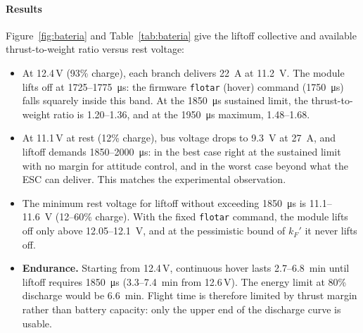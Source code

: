 \paragraph{Results}
Figure~\ref{fig:bateria} and Table~\ref{tab:bateria} give the liftoff collective and available thrust-to-weight ratio versus rest voltage:
\begin{itemize}
  \item At 12.4\,V (93\% charge), each branch delivers \SI{22}{\ampere} at \SI{11.2}{\volt}. The module lifts off at 1725--\SI{1775}{\micro\second}: the firmware \texttt{flotar} (hover) command (\SI{1750}{\micro\second}) falls squarely inside this band. At the \SI{1850}{\micro\second} sustained limit, the thrust-to-weight ratio is 1.20--1.36, and at the \SI{1950}{\micro\second} maximum, 1.48--1.68.
  \item At 11.1\,V at rest (12\% charge), bus voltage drops to \SI{9.3}{\volt} at \SI{27}{\ampere}, and liftoff demands 1850--\SI{2000}{\micro\second}: in the best case right at the sustained limit with no margin for attitude control, and in the worst case beyond what the ESC can deliver. This matches the experimental observation.
  \item The minimum rest voltage for liftoff without exceeding \SI{1850}{\micro\second} is 11.1--\SI{11.6}{\volt} (12--60\% charge). With the fixed \texttt{flotar} command, the module lifts off only above 12.05--\SI{12.1}{\volt}, and at the pessimistic bound of $k_F'$ it never lifts off.
  \item \textbf{Endurance.} Starting from 12.4\,V, continuous hover lasts 2.7--\SI{6.8}{\minute} until liftoff requires \SI{1850}{\micro\second} (3.3--\SI{7.4}{\minute} from 12.6\,V). The energy limit at 80\% discharge would be \SI{6.6}{\minute}. Flight time is therefore limited by thrust margin rather than battery capacity: only the upper end of the discharge curve is usable.
\end{itemize}

